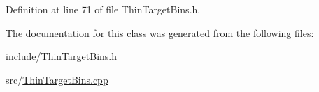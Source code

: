 Definition at line 71 of file Thin\-Target\-Bins.\-h.



The documentation for this class was generated from the following files\-:\begin{DoxyCompactItemize}
\item 
include/\hyperlink{_thin_target_bins_8h}{Thin\-Target\-Bins.\-h}\item 
src/\hyperlink{_thin_target_bins_8cpp}{Thin\-Target\-Bins.\-cpp}\end{DoxyCompactItemize}
